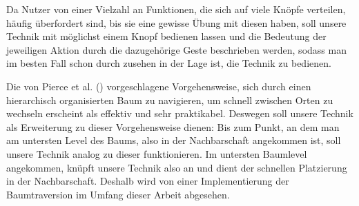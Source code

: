 Da Nutzer von einer Vielzahl an Funktionen, die sich auf viele Knöpfe verteilen, häufig überfordert sind, bis sie eine gewisse Übung mit diesen haben, soll unsere Technik mit möglichst einem Knopf bedienen lassen und die Bedeutung der jeweiligen Aktion durch die dazugehörige Geste beschrieben werden, sodass man im besten Fall schon durch zusehen in der Lage ist, die Technik zu bedienen.

Die von Pierce et al. (\cite{pierce_representations}) vorgeschlagene Vorgehensweise, sich durch einen hierarchisch organisierten Baum zu navigieren, um schnell zwischen Orten zu wechseln erscheint als effektiv und sehr praktikabel. Deswegen soll unsere Technik als Erweiterung zu dieser Vorgehensweise dienen: Bis zum Punkt, an dem man am untersten Level des Baums, also in der Nachbarschaft angekommen ist, soll unsere Technik analog zu dieser funktionieren. Im untersten Baumlevel angekommen, knüpft unsere Technik also an und dient der schnellen Platzierung in der Nachbarschaft. Deshalb wird von einer Implementierung der Baumtraversion im Umfang dieser Arbeit abgesehen.